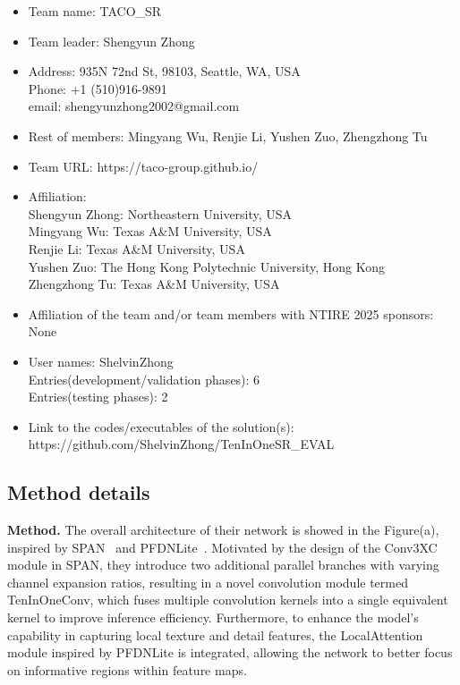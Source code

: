 \documentclass[10pt,twocolumn,letterpaper]{article}
\begin{document}
\begin{itemize}
\item Team name: TACO\_SR                                
\item Team leader: Shengyun Zhong                          
\item Address: 935N 72nd St, 98103, Seattle, WA, USA\\Phone: +1 (510)916-9891\\email: shengyunzhong2002@gmail.com
\item Rest of members: Mingyang Wu, Renjie Li, Yushen Zuo, Zhengzhong Tu      
\item Team URL: https://taco-group.github.io/                   
\item Affiliation:\\
      Shengyun Zhong: Northeastern University, USA \\
      Mingyang Wu: Texas A\&M University, USA \\
      Renjie Li: Texas A\&M University, USA \\
      Yushen Zuo: The Hong Kong Polytechnic University, Hong Kong \\
      Zhengzhong Tu: Texas A\&M University, USA
\item Affiliation of the team and/or team members with NTIRE 2025 sponsors: None
\item User names: ShelvinZhong \\
      Entries(development/validation phases): 6 \\
      Entries(testing phases): 2
\item Link to the codes/executables of the solution(s): https://github.com/ShelvinZhong/TenInOneSR\_EVAL
\end{itemize}

\subsection{Method details}

\textbf{Method. } The overall architecture of their network is showed in the Figure(a), inspired by SPAN~\cite{SPAN2024} and PFDNLite~\cite{NTIRE2024Report}. Motivated by the design of the Conv3XC module in SPAN, they introduce two additional parallel branches with varying channel expansion ratios, resulting in a novel convolution module termed TenInOneConv, which fuses multiple convolution kernels into a single equivalent kernel to improve inference efficiency. Furthermore, to enhance the model’s capability in capturing local texture and detail features, the LocalAttention module inspired by PFDNLite is integrated, allowing the network to better focus on informative regions within feature maps. 
\end{document}
